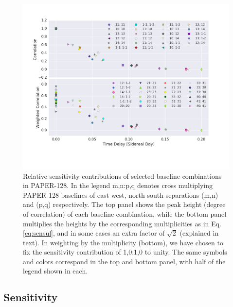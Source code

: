 \documentclass[twocolumn,apj,numberedappendix]{emulateapj}
\renewcommand\[{\begin{equation}}
\renewcommand\]{\end{equation}}
\begin{document}
\begin{figure}[h!]
\includegraphics[width=\linewidth]{sensitivity}

\caption{Relative sensitivity contributions of selected baseline combinations in PAPER-128. In the legend m,n:p,q denotes cross
multiplying PAPER-128 baselines of east-west, north-south separations (m,n) and (p,q) respectively. The top
panel shows the peak height (degree of correlation) of each baseline
combination, while the bottom panel multiplies the heights by the
corresponding multiplicities as in Eq. \eqref{eq:sensul}, and in some cases an extra factor of $\sqrt{2}$ (explained in text). 
In weighting by the multiplicity (bottom), we have chosen to fix the sensitivity 
contribution of 1,0:1,0 to unity. The same symbols and colors correspond in the top and bottom panel, with half of the legend shown in each. }
\label{fig:sensplot}
\end{figure}


\subsection{ Sensitivity \label{sec:sensitivity}}
\end{document}
